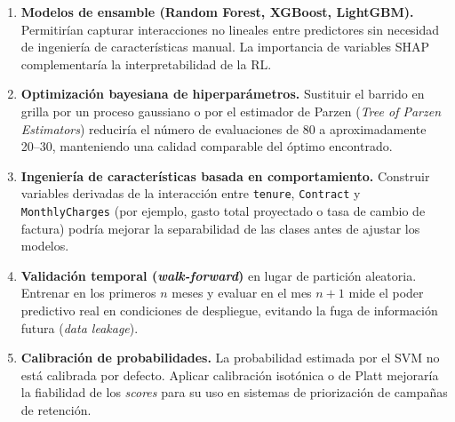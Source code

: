 \documentclass[spanish]{article}
\begin{document}
\begin{enumerate}
    \item \textbf{Modelos de ensamble (Random Forest, XGBoost, LightGBM).} Permitirían capturar interacciones no lineales entre predictores sin necesidad de ingeniería de características manual. La importancia de variables SHAP complementaría la interpretabilidad de la RL.

    \item \textbf{Optimización bayesiana de hiperparámetros.} Sustituir el barrido en grilla por un proceso gaussiano o por el estimador de Parzen (\textit{Tree of Parzen Estimators}) reduciría el número de evaluaciones de 80 a aproximadamente 20–30, manteniendo una calidad comparable del óptimo encontrado.

    \item \textbf{Ingeniería de características basada en comportamiento.} Construir variables derivadas de la interacción entre \texttt{tenure}, \texttt{Contract} y \texttt{MonthlyCharges} (por ejemplo, gasto total proyectado o tasa de cambio de factura) podría mejorar la separabilidad de las clases antes de ajustar los modelos.

    \item \textbf{Validación temporal (\textit{walk-forward})} en lugar de partición aleatoria. Entrenar en los primeros $n$ meses y evaluar en el mes $n+1$ mide el poder predictivo real en condiciones de despliegue, evitando la fuga de información futura (\textit{data leakage}).

    \item \textbf{Calibración de probabilidades.} La probabilidad estimada por el SVM no está calibrada por defecto. Aplicar calibración isotónica o de Platt mejoraría la fiabilidad de los \textit{scores} para su uso en sistemas de priorización de campañas de retención.
\end{enumerate}



\end{document}
